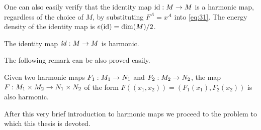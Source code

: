 One can also easily verify that the identity map $\text{id}:M\rightarrow M$ is a
harmonic map, regardless of the choice of $M$, by substituting
$F^A=x^A$ into \eqref{eq:31}. The energy density of the identity map
is $e(\text{id})=\dim(M)/2$.\\

\begin{remark}\label{rem:1}
  The identity map $\text{\emph{id}}:M\rightarrow M$ is harmonic.
\end{remark}

The following remark can be also proved easily.

\begin{remark}\label{rem:2}
  Given two harmonic maps $F_1:M_1\rightarrow N_1$ and $F_2:M_2\rightarrow N_2$, the
  map $F:M_1\times M_2\rightarrow N_1\times N_2$ of the form
  $F((x_1,x_2))=(F_1(x_1),F_2(x_2))$ is also harmonic.
\end{remark}

After this very brief introduction to harmonic maps we proceed to the
problem to which this thesis is devoted.



